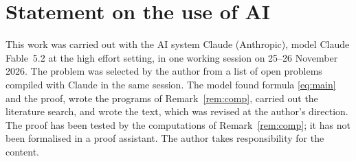 \documentclass[11pt,a4paper]{amsart}
\theoremstyle{remark}
\begin{document}
\section*{Statement on the use of AI}
This work was carried out with the AI system Claude (Anthropic), model Claude Fable~5.2 at the high effort
setting, in one working session on 25--26 November 2026. The problem was selected by the author from a list of
open problems compiled with Claude in the same session. The model found formula \eqref{eq:main} and the proof, wrote the programs of
Remark~\ref{rem:comp}, carried out the literature search, and wrote the text, which was revised at the author's
direction. The proof has been tested by the computations of Remark~\ref{rem:comp}; it has not been formalised in
a proof assistant. The author takes responsibility for the content.
\end{document}
